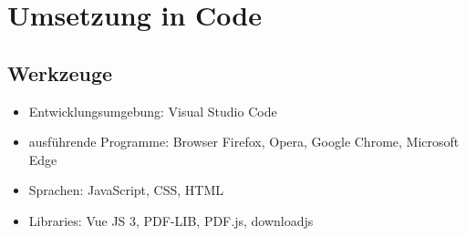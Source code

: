 \section{Umsetzung in Code}


\subsection{Werkzeuge}
\begin{itemize}
	\item Entwicklungsumgebung: Visual Studio Code
	\item ausführende Programme: Browser Firefox, Opera, Google Chrome, Microsoft Edge
	\item Sprachen: JavaScript, CSS, HTML
	\item Libraries: Vue JS 3, PDF-LIB, PDF.js, downloadjs
\end{itemize}

